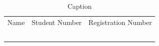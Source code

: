 \def\projTitle{Emerging Trends in Computer Science: Cybersecurity Innovation}


\def\projAuthorOneName      {Group 4}

\begin{table}
    \centering
    \begin{tabular}{ccc}
        Name & Student Number & Registration Number\\
         &  & \\
         &  & \\
         &  & \\
         &  & \\
         &  & \\
    \end{tabular}
    \caption{Caption}
    \label{tab:placeholder}
\end{table}
\def\projAuthorOneRollno    {202xxxx}


\def\projAuthorTwoName      {Lorem Ipsum1}
\def\projAuthorTwoRollno    {202xxxx}


\def\prog{B.Tech. in Computer Science \& Engineering}


\def\btptrack{Research}


\def\advisorone     {Prof. Lorem Ipsum}
\def\advisortwo     {}
\def\advisorthree   {}
\def\advisorfour    {}
